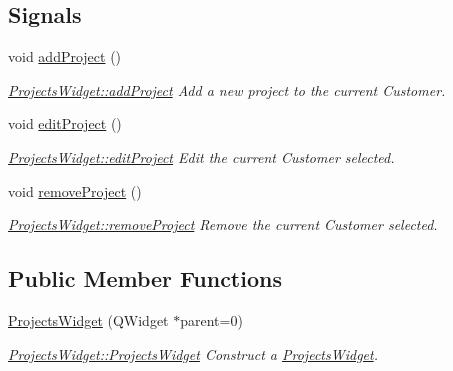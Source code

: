 \subsection*{Signals}
\begin{DoxyCompactItemize}
\item 
\hypertarget{classGui_1_1Widgets_1_1ProjectsWidget_a25a20fde082c2698d7067d10e5795c0f}{void \hyperlink{classGui_1_1Widgets_1_1ProjectsWidget_a25a20fde082c2698d7067d10e5795c0f}{add\-Project} ()}\label{classGui_1_1Widgets_1_1ProjectsWidget_a25a20fde082c2698d7067d10e5795c0f}

\begin{DoxyCompactList}\small\item\em \hyperlink{classGui_1_1Widgets_1_1ProjectsWidget_a25a20fde082c2698d7067d10e5795c0f}{Projects\-Widget\-::add\-Project} Add a new project to the current Customer. \end{DoxyCompactList}\item 
\hypertarget{classGui_1_1Widgets_1_1ProjectsWidget_a8a49da147544ffd78131af2b9289c9d0}{void \hyperlink{classGui_1_1Widgets_1_1ProjectsWidget_a8a49da147544ffd78131af2b9289c9d0}{edit\-Project} ()}\label{classGui_1_1Widgets_1_1ProjectsWidget_a8a49da147544ffd78131af2b9289c9d0}

\begin{DoxyCompactList}\small\item\em \hyperlink{classGui_1_1Widgets_1_1ProjectsWidget_a8a49da147544ffd78131af2b9289c9d0}{Projects\-Widget\-::edit\-Project} Edit the current Customer selected. \end{DoxyCompactList}\item 
\hypertarget{classGui_1_1Widgets_1_1ProjectsWidget_ac713b0c5c9afba988923fe3e29b405dc}{void \hyperlink{classGui_1_1Widgets_1_1ProjectsWidget_ac713b0c5c9afba988923fe3e29b405dc}{remove\-Project} ()}\label{classGui_1_1Widgets_1_1ProjectsWidget_ac713b0c5c9afba988923fe3e29b405dc}

\begin{DoxyCompactList}\small\item\em \hyperlink{classGui_1_1Widgets_1_1ProjectsWidget_ac713b0c5c9afba988923fe3e29b405dc}{Projects\-Widget\-::remove\-Project} Remove the current Customer selected. \end{DoxyCompactList}\end{DoxyCompactItemize}
\subsection*{Public Member Functions}
\begin{DoxyCompactItemize}
\item 
\hyperlink{classGui_1_1Widgets_1_1ProjectsWidget_a400712a956057c7233c396bffeb7a086}{Projects\-Widget} (Q\-Widget $\ast$parent=0)
\begin{DoxyCompactList}\small\item\em \hyperlink{classGui_1_1Widgets_1_1ProjectsWidget_a400712a956057c7233c396bffeb7a086}{Projects\-Widget\-::\-Projects\-Widget} Construct a \hyperlink{classGui_1_1Widgets_1_1ProjectsWidget}{Projects\-Widget}. \end{DoxyCompactList}\end{DoxyCompactItemize}


